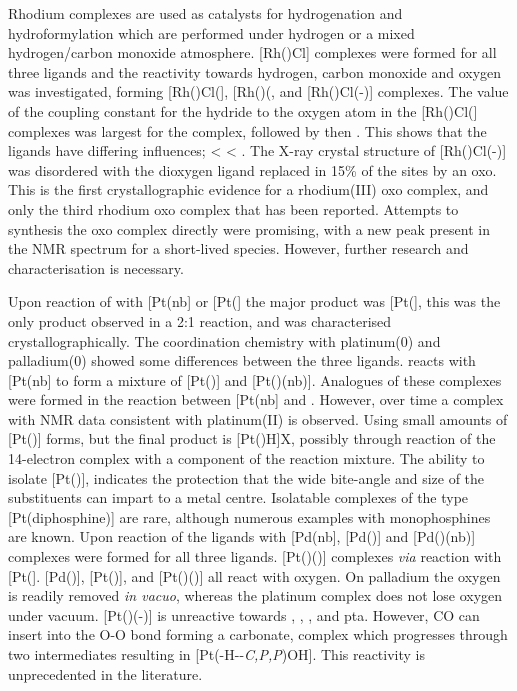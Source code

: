 Rhodium complexes are used as catalysts for hydrogenation and hydroformylation which are performed under hydrogen or a mixed hydrogen/carbon monoxide atmosphere.  [Rh(\tBuxantphosk)Cl] complexes were formed for all three \tBuxantphos{} ligands and the reactivity towards hydrogen, carbon monoxide and oxygen was investigated, forming [Rh(\tBuxantphosk)Cl(], [Rh(\tBuxantphos)(\ce{CO)2Cl]}, and [Rh(\tBuxantphosk)Cl(-)] complexes.  The value of the \JRhH{} coupling constant for the hydride \trans{} to the oxygen atom in the [Rh(\tBuxantphosk)Cl(] complexes was largest for the \tBusixantphos{} complex, followed by \tButhixantphos{} then \tBuxantphos{}.  This shows that the ligands have differing \trans{} influences; \tBusixantphos{} \textless{} \tButhixantphos{} \textless{} \tBuxantphos.  The X-ray crystal structure of [Rh(\tBuxantphosk)Cl(-)] was disordered with the dioxygen ligand replaced in 15\% of the sites by an oxo.  This is the first crystallographic evidence for a rhodium(III) oxo complex, and only the third rhodium oxo complex that has been reported.  Attempts to synthesis the oxo complex directly were promising, with a new peak present in the \phosphorus{} NMR spectrum for a short-lived species.  However, further research and characterisation is necessary.

Upon reaction of \Phthixantphos{} with [Pt(nb] or [Pt(] the major product was [Pt(\Phthixantphos{}], this was the only product observed in a 2:1 reaction, and was characterised crystallographically.  The coordination chemistry with platinum(0) and palladium(0) showed some differences between the three \tBuxantphos{} ligands.  \tBuThixantphos{} reacts with [Pt(nb] to form a mixture of [Pt(\tButhixantphos)] and [Pt(\tButhixantphos)(nb)].  Analogues of these complexes were formed in the reaction between [Pt(nb] and \tBusixantphos{}.  However, over time a complex with NMR data consistent with platinum(II) is observed.  Using \tBuxantphos{} small amounts of [Pt(\tBuxantphos)] forms, but the final product is [Pt(\tBuxantphos)H]X, possibly through reaction of the 14-electron complex with a component of the reaction mixture.  The ability to isolate [Pt(\tButhixantphos)], indicates the protection that the wide bite-angle and size of the \tBu{} substituents can impart to a metal centre.  Isolatable complexes of the type [Pt(diphosphine)] are rare, although numerous examples with monophosphines are known.  Upon reaction of the \tBuxantphos{} ligands with [Pd(nb], [Pd(\tBuxantphos)] and [Pd(\tBuxantphos)(nb)] complexes were formed for all three ligands.  [Pt(\tBuxantphos)()] complexes \emph{via} reaction with [Pt(].  [Pd(\tButhixantphos)], [Pt(\tButhixantphos)], and [Pt(\tButhixantphos)()] all react with oxygen.  On palladium the oxygen is readily removed \emph{in vacuo}, whereas the platinum complex does not lose oxygen under vacuum.  [Pt(\tButhixantphos)(-)] is unreactive towards , , ,  and pta.  However, CO can insert into the O-O bond forming a carbonate, complex which progresses through two intermediates resulting in [Pt(\tButhixantphos-H-\dento{}-\emph{C,P,P}\textprime)OH].  This reactivity is unprecedented in the literature.  


